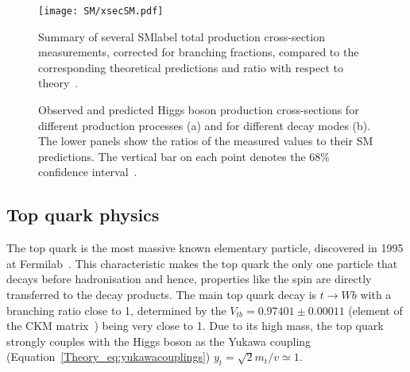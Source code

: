 \begin{figure}[htbp]
    \RawFloats
    \begin{center}
    \texttt{[image: SM/xsecSM.pdf]}
    \caption{
        Summary of several \acrshort{SMlabel} total production cross-section measurements, corrected for branching fractions, compared to the corresponding theoretical predictions and ratio with respect to theory~\cite{ATLAS:2022djm}. 
    }
    \label{figSM:xsecSM}
    \end{center}
\end{figure}

\begin{figure}[htbp]
    \RawFloats
    \begin{center}
        \quad
        \caption{
            Observed and predicted Higgs boson production cross-sections for different production processes (a) and for different decay modes (b). The lower panels show the ratios of the measured values to their SM predictions. The vertical bar on each point denotes the 68\% confidence interval~\cite{HiggssumaryAtlas2022}.}
    \label{figSM:xsecBRH}
    \end{center}
\end{figure}

\clearpage
\subsection{Top quark physics}

The top quark is the most massive known elementary particle, discovered in 1995 at Fermilab~\cite{topsearch1995,PhysRevLett.74.2626}. This characteristic makes the top quark the only one particle that decays before hadronisation and hence, properties like the spin are directly transferred to the decay products. The main top quark decay is $t\to Wb$ with a branching ratio close to 1, determined by the $V_{tb}=0.97401 \pm 0.00011$ (element of the CKM matrix~\cite{pdg}) being very close to 1. Due to its high mass, the top quark strongly couples with the Higgs boson as the Yukawa coupling (Equation~\ref{Theory_eq:yukawacouplings}) $y_t=\sqrt{2}m_t/v\simeq 1$.\\

